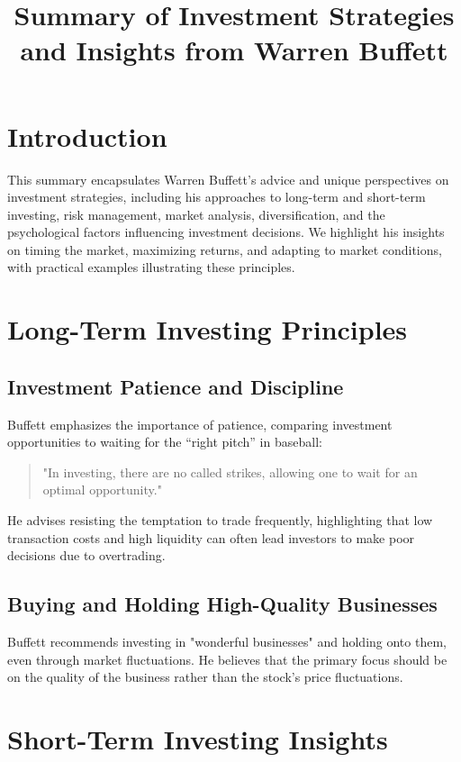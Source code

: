 \documentclass{article}
\title{Summary of Investment Strategies and Insights from Warren Buffett}
\author{}
\date{}
\begin{document}
\maketitle

\section*{Introduction}
This summary encapsulates Warren Buffett's advice and unique perspectives on investment strategies, including his approaches to long-term and short-term investing, risk management, market analysis, diversification, and the psychological factors influencing investment decisions. We highlight his insights on timing the market, maximizing returns, and adapting to market conditions, with practical examples illustrating these principles.

\section{Long-Term Investing Principles}

\subsection*{Investment Patience and Discipline}
Buffett emphasizes the importance of patience, comparing investment opportunities to waiting for the “right pitch” in baseball:
\begin{quote}
    "In investing, there are no called strikes, allowing one to wait for an optimal opportunity."
\end{quote}
He advises resisting the temptation to trade frequently, highlighting that low transaction costs and high liquidity can often lead investors to make poor decisions due to overtrading.

\subsection*{Buying and Holding High-Quality Businesses}
Buffett recommends investing in "wonderful businesses" and holding onto them, even through market fluctuations. He believes that the primary focus should be on the quality of the business rather than the stock's price fluctuations.

\section{Short-Term Investing Insights}
\end{document}
